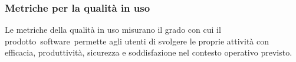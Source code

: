\documentclass[../PianoDiQualifica.tex]{subfiles}
\begin{document}
\begin{appendices}
	\subsubsection{Metriche per la qualità in uso}
	Le metriche della qualità in uso misurano il grado con cui il prodotto\g\ software\g\ permette agli utenti di svolgere le proprie attività con efficacia, produttività, sicurezza e soddisfazione nel contesto operativo previsto.
	
\end{appendices}
\end{document}
